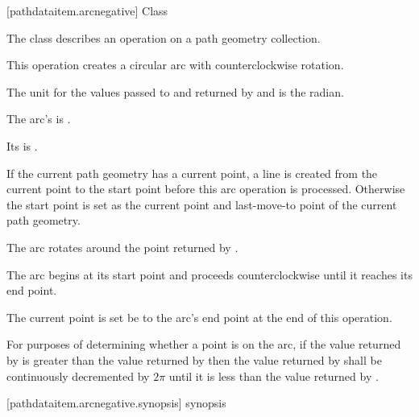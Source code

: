  [pathdataitem.arcnegative] {Class }

\pnum
{}
The class  describes an operation on a path geometry collection.

\pnum
This operation creates a circular arc with counterclockwise rotation.

\pnum
The unit for the values passed to and returned by  and  is the radian.

\pnum
The arc's  is .

\pnum
Its  is .

\pnum
If the current path geometry has a current point, a line is created from the current point to the start point before this arc operation is processed. Otherwise the start point is set as the current point and last-move-to point of the current path geometry.

\pnum
The arc rotates around the point returned by .

\pnum
The arc begins at its start point and proceeds counterclockwise until it reaches its end point.

\pnum
The current point is set be to the arc's end point at the end of this operation.

\pnum
For purposes of determining whether a point is on the arc, if the value returned by  is greater than the value returned by  then the value returned by  shall be continuously decremented by $2\pi$ until it is less than the value returned by .

 [pathdataitem.arcnegative.synopsis] { synopsis}

